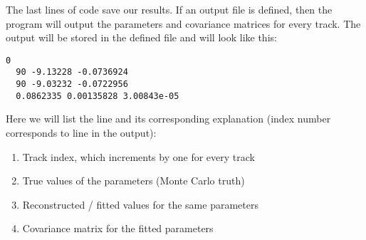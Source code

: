 \documentclass{article}
\begin{document}
\noindent The last lines of code save our results.
If an output file is defined, then the program will output the parameters and covariance matrices for every track.
The output will be stored in the defined file and will look like this:
\begin{lstlisting}[caption=Output]
  0 
  90 -9.13228 -0.0736924
  90 -9.03232 -0.0722956
  0.0862335 0.00135828 3.00843e-05
\end{lstlisting}
Here we will list the line and its corresponding explanation (index number corresponds to line in the output):
\begin{enumerate}
  \item Track index, which increments by one for every track
  \item True values of the parameters (Monte Carlo truth)
  \item Reconstructed / fitted values for the same parameters
  \item Covariance matrix for the fitted parameters
\end{enumerate}

  
\end{document}
